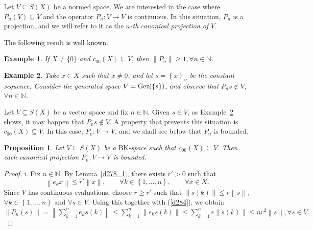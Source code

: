 \documentclass[14pt, a4paper]{article}  %
\newcounter{property}
\providecommand{\llave}[1]{\left\lbrace #1\right\rbrace }
\providecommand{\pare}[1]{\left( #1\right) }
\providecommand{\norm}[1]{\left\lVert#1\right\rVert}
\newcommand{\tien}{\rightarrow}
\newcommand{\N}{\mathbb{N}}
\newcommand{\BK}{\text{BK}}
\newcommand{\G}{\textup{Gen}\hspace{-.1cm}}
\newtheorem{proposition}{Proposition}[section]
\newtheorem{example}{Example}[section]  %
\begin{document}
	Let $V \subseteq S(X)$ be a normed space. We are interested in the case where $P_{n}(V) \subseteq V$ and the operator $P_{n}: V \to V$ is continuous. In this situation, $P_{n}$ is a projection, and we will refer to it as the \emph{$n$-th canonical projection of $V$}. 
	
	The following result is well known.
	\begin{example}\label{lola129}
		If $X \neq \{0\}$ and $c_{00}(X) \subseteq V$, then $\|P_n\| \geq 1, \forall n \in \mathbb{N}$.
	\end{example}  
	
	\begin{example}\label{d293}
		Take $x\in X$ such that $x\neq 0$, and let $s=\llave{x}_{n}$ be the constant sequence. Consider the generated space $V=\G\pare{\llave{s}}$, and observe that $P_{n}s\notin V$, $\forall n\in \N$.
	\end{example}
	
	Let $V\subseteq S\pare{X}$ be a vector space and fix $n\in \N$. Given $s\in V$, as Example~\ref{d293} shows, it may happen that $P_{n}s\notin V$. A property that prevents this situation is $c_{00}\pare{X}\subseteq V$. In this case, $P_{n}:V\tien V$, and we shall see below that $P_{n}$ is bounded. 
	
	
	\begin{proposition}\label{d268_0_a_0} \label{d285_a_0}
		Let $V\subseteq S\pare{X}$ be a $\BK$-space such that $c_{00}\pare{X}\subseteq V$. Then each canonical projection $P_{n}:V\tien V$ is bounded. 
	\end{proposition} 
	\begin{proof}
		i. Fix $n\in \N$. By Lemma~\ref{d278_1}, there exists $r'>0$ such that
		\begin{equation}\label{d284}
			\norm{e_{k}x}\leq r'\norm{x},
			\qquad
			\forall k\in \llave{1,\dots,n},
			\qquad
			\forall x\in X.
		\end{equation}
		Since $V$ has continuous evaluations, choose $r\geq r'$ such that
		$
		\norm{s\pare{k}}\leq r\norm{s},
		$
		$\forall k\in \llave{1,\dots,n}$ and $\forall s\in V$. Using this together with (\ref{d284}), we obtain
		$
		\norm{P_{n}\pare{s}}
		=
		\norm{\sum_{k=1}^{n}e_{k}s\pare{k}}
		\leq
		\sum_{k=1}^{n}\norm{e_{k}s\pare{k}}
		\leq
		\sum_{k=1}^{n}r\norm{s\pare{k}}
		\leq
		nr^{2}\norm{s}, 
		\forall s\in V.
		$ 
	\end{proof}
	

	
 
	
	
\end{document}
